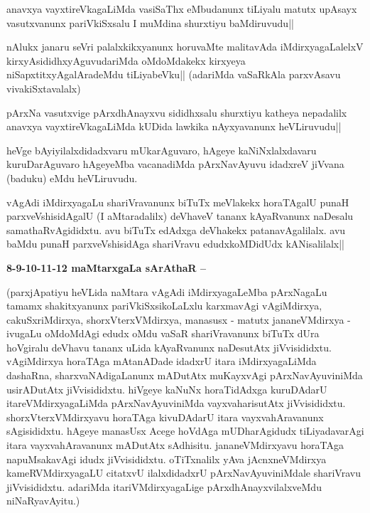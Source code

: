 \stext


\begin{artha}
anavxya vayxtireVkagaLiMda vasiSaThx eMbudanunx tiLiyalu matutx 
upAsayx vasutxvanunx pariVkiSxsalu I muMdina shurxtiyu baMdiruvudu||
\end{artha}


\begin{artha}
nAlukx janaru seVri palalxkikxyanunx horuvaMte malitavAda 
iMdirxyagaLalelxV kirxyAsididhxyAguvudariMda oMdoMdakekx kirxyeya 
niSapxtitxyAgalAradeMdu tiLiyabeVku|| (adariMda vaSaRkAla parxvAsavu 
vivakiSxtavalalx)
\end{artha}

\begin{artha}
pArxNa vasutxvige pArxdhAnayxvu sididhxsalu shurxtiyu katheya 
nepadalilx anavxya vayxtireVkagaLiMda kUDida lawkika nAyxyavanunx 
heVLiruvudu||
\end{artha}


\begin{artha}
heVge bAyiyilalxdidadxvaru mUkarAguvaro, hAgeye kaNiNxlalxdavaru 
kuruDarAguvaro hAgeyeMba vacanadiMda pArxNavAyuvu idadxreV jiVvana 
(baduku) eMdu heVLiruvudu.
\end{artha}

\begin{artha}
vAgAdi iMdirxyagaLu shariVravanunx biTuTx meVlakekx horaTAgalU punaH 
parxveVshisidAgalU (I aMtaradalilx) deVhaveV tananx kAyaRvanunx 
naDesalu samathaRvAgididxtu. avu biTuTx edAdxga deVhakekx 
patanavAgalilalx. avu baMdu punaH parxveVshisidAga shariVravu 
edudxkoMDidUdx kANisalilalx||
\end{artha}

\textbf{8-9-10-11-12 maMtarxgaLa sArAthaR --}

(parxjApatiyu heVLida naMtara vAgAdi iMdirxyagaLeMba pArxNagaLu tamamx 
shakitxyanunx pariVkiSxsikoLaLxlu karxmavAgi vAgiMdirxya, 
cakuSxriMdirxya, shorxVterxVMdirxya, manasusx - matutx jananeVMdirxya 
- ivugaLu oMdoMdAgi edudx oMdu vaSaR shariVravanunx biTuTx dUra 
hoVgiralu deVhavu tananx uLida kAyaRvanunx naDesutAtx jiVvisididxtu. 
vAgiMdirxya horaTAga mAtanADade idadxrU itara iMdirxyagaLiMda 
dashaRna, sharxvaNAdigaLanunx mADutAtx muKayxvAgi pArxNavAyuviniMda 
usirADutAtx jiVvisididxtu. hiVgeye kaNuNx horaTidAdxga kuruDAdarU 
itareVMdirxyagaLiMda pArxNavAyuviniMda vayxvaharisutAtx jiVvisididxtu. 
shorxVterxVMdirxyavu horaTAga kivuDAdarU itara vayxvahAravanunx 
sAgisididxtu. hAgeye manasUsx Acege hoVdAga mUDharAgidudx 
tiLiyadavarAgi itara vayxvahAravanunx mADutAtx sAdhisitu. 
jananeVMdirxyavu horaTAga napuMsakavAgi idudx jiVvisididxtu. 
oTiTxnalilx yAva jAcnxneVMdirxya kameRVMdirxyagaLU citatxvU 
ilalxdidadxrU pArxNavAyuviniMdale shariVravu jiVvisididxtu. adariMda 
itariVMdirxyagaLige pArxdhAnayxvilalxveMdu niNaRyavAyitu.)

